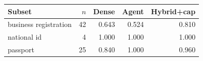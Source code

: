 \begin{tabular}{@{}lrrrr@{}}
\toprule
Subset & $n$ & Dense & Agent & Hybrid+cap \\
\midrule
business registration & 42 & 0.643 & 0.524 & 0.810 \\
national id & 4 & 1.000 & 1.000 & 1.000 \\
passport & 25 & 0.840 & 1.000 & 0.960 \\
\bottomrule
\end{tabular}